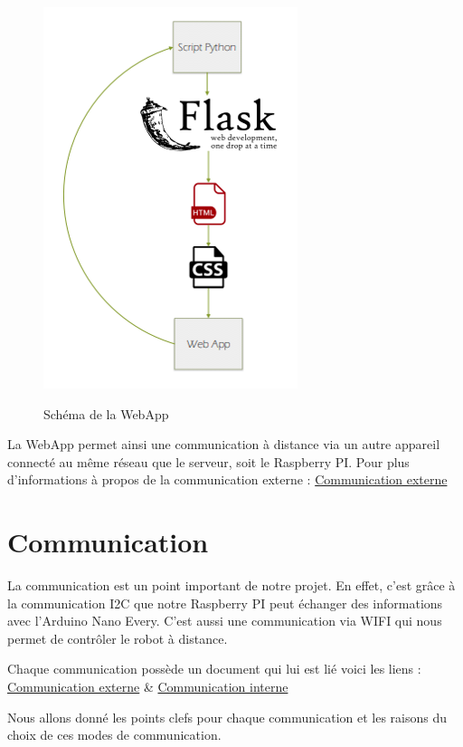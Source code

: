 \documentclass[
	a4paper,									%
	11pt,										%
	twoside,									%
	openright,									%
	notitlepage,									%
	parskip=half,								%
]{scrreprt}										%
\begin{document}
\begin{figure}[!h]
	\centering
	\includegraphics[scale=.8]{img/Schema_WebApp.png}
	\label{WebApp}
	\caption{Schéma de la WebApp}
\end{figure}

La WebApp permet ainsi une communication à distance via un autre appareil connecté au même réseau que le serveur, soit 
le Raspberry PI. Pour plus d'informations à propos de la communication externe : \href{run:./Comm_Externe}{Communication externe} \par

\section{Communication}

La communication est un point important de notre projet. En effet, c'est grâce à la communication I2C que notre Raspberry PI peut 
échanger des informations avec l'Arduino Nano Every. C'est aussi une communication via WIFI qui nous permet de contrôler le robot 
à distance. \par

Chaque communication possède un document qui lui est lié voici les liens : \href{run:./Comm_Externe}{Communication externe} \&
\href{run:./Comm_interne}{Communication interne} \par

Nous allons donné les points clefs pour chaque communication et les raisons du choix de ces modes de communication. \par
\end{document}

